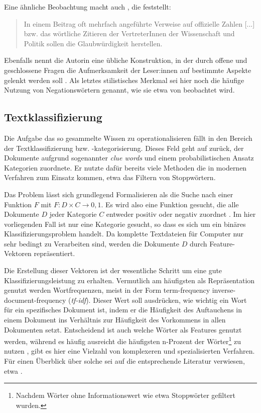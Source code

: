 Eine ähnliche Beobachtung macht auch \textcite{filatkina_2018}, die feststellt:

\begin{quotation}
    In einem Beitrag oft mehrfach angeführte Verweise auf offizielle Zahlen [...] bzw. das wörtliche Zitieren der VertreterInnen der Wissenschaft und Politik sollen die Glaubwürdigkeit herstellen. \parencite[][208]{filatkina_2018}
\end{quotation}

Ebenfalls nennt die Autorin eine übliche Konstruktion, in der durch offene und geschlossene Fragen die Aufmerksamkeit der Leser:innen auf bestimmte Aspekte gelenkt werden soll \parencite[][205]{filatkina_2018}.
Als letztes stilistisches Merkmal sei hier noch die häufige Nutzung von Negationswörtern genannt, wie sie etwa von \textcite[149]{stumpf_2019} beobachtet wird.

\subsection{Textklassifizierung}

Die Aufgabe das so gesammelte Wissen zu operationalisieren fällt in den Bereich der Textklassifizierung bzw. -kategorisierung.
Dieses Feld geht auf \textcite{maron_1961} zurück, der Dokumente aufgrund sogenannter \textit{clue words} und einem probabilistischen Ansatz Kategorien zuordnete.
Er nutzte dafür bereits viele Methoden die in modernen Verfahren zum Einsatz kommen, etwa das Filtern von Stoppwörtern.

Das Problem lässt sich grundlegend Formalisieren als die Suche nach einer Funktion $F$ mit $F : D \times C \rightarrow {0, 1}$.
Es wird also eine Funktion gesucht, die alle Dokumente $D$ jeder Kategorie $C$ entweder positiv oder negativ zuordnet \parencite[][66f]{feldman_sanger_2006}.
Im hier vorliegenden Fall ist nur eine Kategorie gesucht, so dass es sich um ein binäres Klassifizierungsproblem handelt.
Da komplette Textdateien für Computer nur sehr bedingt zu Verarbeiten sind, werden die Dokumente $D$ durch Feature-Vektoren repräsentiert.

Die Erstellung dieser Vektoren ist der wesentliche Schritt um eine gute Klassifizierungsleistung zu erhalten.
Vermutlich am häufigsten als Repräsentation genutzt werden Wortfrequenzen, meist in der Form term-frequency inverse-document-frequency (\textit{tf-idf}).
Dieser Wert soll ausdrücken, wie wichtig ein Wort für ein spezifisches Dokument ist, indem er die Häufigkeit des Auftauchens in einem Dokument ins Verhältnis zur Häufigkeit des Vorkommens in allen Dokumenten setzt.
Entscheidend ist auch welche Wörter als Features genutzt werden, während es häufig ausreicht die häufigsten n-Prozent der Wörter\footnote{Nachdem Wörter ohne Informationswert wie etwa Stoppwörter gefiltert wurden.} zu nutzen \parencite[][68]{feldman_sanger_2006}, gibt es hier eine Vielzahl von komplexeren und spezialisierten Verfahren.
Für einen Überblick über solche sei auf die entsprechende Literatur verwiesen, etwa \textcite{yang_1997}.


